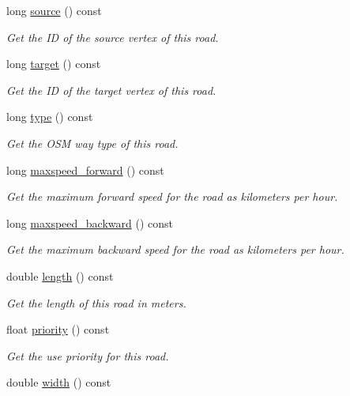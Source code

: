 \begin{DoxyCompactItemize}
long \hyperlink{classgeo_1_1Road_aeb43e9d82bbcab6a14a34abb749c4315}{source} () const 
\begin{DoxyCompactList}\small\item\em Get the ID of the source vertex of this road. \end{DoxyCompactList}\item 
long \hyperlink{classgeo_1_1Road_adc5ce304928ae25948a4e4d96f239751}{target} () const 
\begin{DoxyCompactList}\small\item\em Get the ID of the target vertex of this road. \end{DoxyCompactList}\item 
long \hyperlink{classgeo_1_1Road_a22e7817a996ae5367f549228bbdda1b9}{type} () const 
\begin{DoxyCompactList}\small\item\em Get the O\+SM way type of this road. \end{DoxyCompactList}\item 
long \hyperlink{classgeo_1_1Road_a08506729380f0ec23720cffd27ea3d16}{maxspeed\+\_\+forward} () const 
\begin{DoxyCompactList}\small\item\em Get the maximum forward speed for the road as kilometers per hour. \end{DoxyCompactList}\item 
long \hyperlink{classgeo_1_1Road_a4278e486912e378390de155ca0bb2fc9}{maxspeed\+\_\+backward} () const 
\begin{DoxyCompactList}\small\item\em Get the maximum backward speed for the road as kilometers per hour. \end{DoxyCompactList}\item 
double \hyperlink{classgeo_1_1Road_ae8ac2aa49e88d8698fac37e74d07b829}{length} () const 
\begin{DoxyCompactList}\small\item\em Get the length of this road in meters. \end{DoxyCompactList}\item 
float \hyperlink{classgeo_1_1Road_a24e121011f2b204e1d591c6a4f886380}{priority} () const 
\begin{DoxyCompactList}\small\item\em Get the use priority for this road. \end{DoxyCompactList}\item 
double \hyperlink{classgeo_1_1Road_ad102794fac433fc684647827d79f0aeb}{width} () const 

\end{DoxyCompactItemize}

